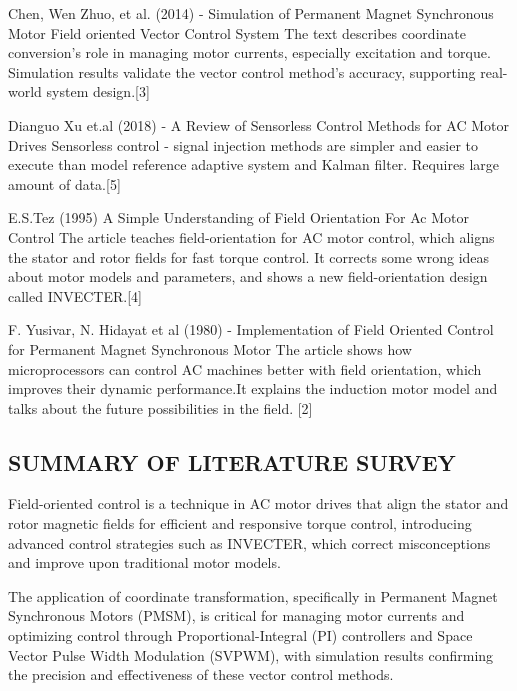 Chen, Wen Zhuo, et al. (2014) -   Simulation of Permanent Magnet Synchronous Motor Field oriented Vector Control System   The text describes coordinate conversion's role in managing motor currents, especially excitation and torque.  Simulation results validate the vector control method's accuracy, supporting real-world system design.[3]


\vspace{10mm} %

Dianguo Xu  et.al (2018) -  A Review of Sensorless Control Methods for AC Motor Drives  Sensorless control - signal injection methods are simpler and easier to execute than model reference adaptive system and Kalman filter. Requires large amount of data.[5]




\vspace{10mm} %

E.S.Tez (1995) A Simple Understanding of Field Orientation For Ac Motor Control The article teaches field-orientation for AC motor control, which aligns the stator and rotor fields for fast torque control. It corrects some wrong ideas about motor models and parameters, and shows a new field-orientation design called INVECTER.[4]

\vspace{10mm} %

F. Yusivar, N. Hidayat et al (1980) -  Implementation of Field Oriented Control for Permanent Magnet Synchronous Motor     The article shows how microprocessors can control AC machines better with field orientation, which improves their dynamic performance.It explains the induction motor model and talks about the future possibilities in the field. [2]



\subsection{SUMMARY OF LITERATURE SURVEY}


\hspace{0.2in} Field-oriented control is a technique in AC motor drives that align the stator and rotor magnetic fields for efficient and responsive torque control, introducing advanced control strategies such as INVECTER, which correct misconceptions and improve upon traditional motor models.


The application of coordinate transformation, specifically in Permanent Magnet Synchronous Motors (PMSM), is critical for managing motor currents and optimizing control through Proportional-Integral (PI) controllers and Space Vector Pulse Width Modulation (SVPWM), with simulation results confirming the precision and effectiveness of these vector control methods.


